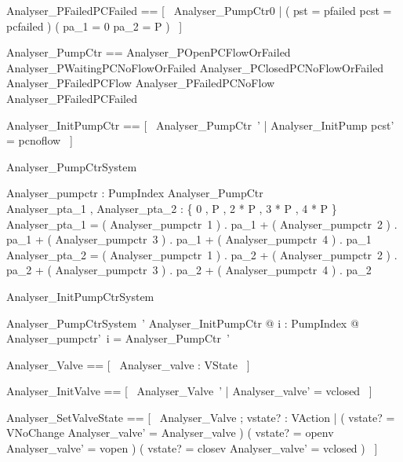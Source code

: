 \documentclass{article}
\begin{document}
\begin{zed}
	Analyser\_PFailedPCFailed == [~  Analyser\_PumpCtr0 | ( pst = pfailed \land pcst = pcfailed ) \implies ( pa\_1 = 0 \land pa\_2 = P )  ~]
\end{zed}

\begin{zed}
	Analyser\_PumpCtr == Analyser\_POpenPCFlowOrFailed \land Analyser\_PWaitingPCNoFlowOrFailed \land Analyser\_PClosedPCNoFlowOrFailed \land Analyser\_PFailedPCFlow \land Analyser\_PFailedPCNoFlow \land Analyser\_PFailedPCFailed
\end{zed}

\begin{zed}
	Analyser\_InitPumpCtr == [~  Analyser\_PumpCtr~' | Analyser\_InitPump \land pcst' = pcnoflow  ~]
\end{zed}

\begin{schema}{Analyser\_PumpCtrSystem}

 Analyser\_pumpctr : PumpIndex \fun Analyser\_PumpCtr \\
 Analyser\_pta\_1 , Analyser\_pta\_2 : \{ 0 , P , 2 * P , 3 * P , 4 * P \} 
\where
 Analyser\_pta\_1 = ( Analyser\_pumpctr~1 ) . pa\_1 + ( Analyser\_pumpctr~2 ) . pa\_1 + ( Analyser\_pumpctr~3 ) . pa\_1 + ( Analyser\_pumpctr~4 ) . pa\_1 \\
 Analyser\_pta\_2 = ( Analyser\_pumpctr~1 ) . pa\_2 + ( Analyser\_pumpctr~2 ) . pa\_2 + ( Analyser\_pumpctr~3 ) . pa\_2 + ( Analyser\_pumpctr~4 ) . pa\_2
\end{schema}

\begin{schema}{Analyser\_InitPumpCtrSystem}

 Analyser\_PumpCtrSystem~' 
\where
 \exists Analyser\_InitPumpCtr @ \forall i : PumpIndex @ Analyser\_pumpctr'~i = \theta Analyser\_PumpCtr~'
\end{schema}

\begin{zed}
	Analyser\_Valve == [~  Analyser\_valve : VState  ~]
\end{zed}

\begin{zed}
	Analyser\_InitValve == [~  Analyser\_Valve~' | Analyser\_valve' = vclosed  ~]
\end{zed}

\begin{zed}
	Analyser\_SetValveState == [~  \Delta Analyser\_Valve ; vstate? : VAction | ( vstate? = VNoChange \implies Analyser\_valve' = Analyser\_valve ) \land ( vstate? = openv \implies Analyser\_valve' = vopen ) \land ( vstate? = closev \implies Analyser\_valve' = vclosed )  ~]
\end{zed}
\end{document}
